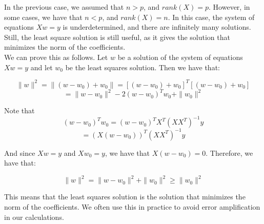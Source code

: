 In the previous case, we assumed that $n > p$, and $rank(X) = p$. However, in some cases, we have that $n < p$, and
$rank(X) = n$. In this case, the system of equations $X w = y$ is underdetermined, and there are infinitely many solutions.
Still, the least square solution is still useful, as it gives the solution that minimizes the norm of the coefficients.\\

We can prove this as follows. Let $w$ be a solution of the system of equations $X w = y$ and let $w_0$ be the least squares
solution. Then we have that:

$$\|w\|^2 = \|(w - w_0) + w_0\| = [(w - w_0) + w_0]^T [(w - w_0) + w_0]$$
$$= \|w - w_0\|^2 - 2 (w - w_0)^T w_0 + \|w_0\|^2$$

Note that 
$$(w - w_0)^T w_0 = (w - w_0)^T X^T(X X^T)^{-1} y$$
$$= (X (w - w_0))^T (X X^T)^{-1} y$$

And since $X w = y$ and $X w_0 = y$, we have that $X (w - w_0) = 0$. Therefore, we have that:

$$\|w\|^2 = \|w - w_0\|^2 + \|w_0\|^2 \geq \|w_0\|^2$$

This means that the least squares solution is the solution that minimizes the norm of the coefficients.
We often use this in practice to avoid error amplification in our calculations.

